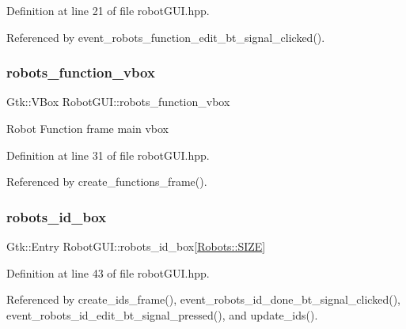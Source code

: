 Definition at line 21 of file robot\+G\+U\+I.\+hpp.



Referenced by event\+\_\+robots\+\_\+function\+\_\+edit\+\_\+bt\+\_\+signal\+\_\+clicked().

\mbox{\label{class_robot_g_u_i_a6d09ae30b925d6efd7c16e20b21c1781}} 
\subsubsection{\texorpdfstring{robots\+\_\+function\+\_\+vbox}{robots\_function\_vbox}}
{\footnotesize\ttfamily Gtk\+::\+V\+Box Robot\+G\+U\+I\+::robots\+\_\+function\+\_\+vbox\hspace{0.3cm}{\ttfamily [private]}}

Robot Function frame main vbox 

Definition at line 31 of file robot\+G\+U\+I.\+hpp.



Referenced by create\+\_\+functions\+\_\+frame().

\mbox{\label{class_robot_g_u_i_a1e475a8f99d5f0b3b29286731ddf0550}} 
\subsubsection{\texorpdfstring{robots\+\_\+id\+\_\+box}{robots\_id\_box}}
{\footnotesize\ttfamily Gtk\+::\+Entry Robot\+G\+U\+I\+::robots\+\_\+id\+\_\+box\mbox{[}\hyperlink{class_robots_ae9df2f1d345ad6740f0459956cdd4712}{Robots\+::\+S\+I\+ZE}\mbox{]}\hspace{0.3cm}{\ttfamily [private]}}



Definition at line 43 of file robot\+G\+U\+I.\+hpp.



Referenced by create\+\_\+ids\+\_\+frame(), event\+\_\+robots\+\_\+id\+\_\+done\+\_\+bt\+\_\+signal\+\_\+clicked(), event\+\_\+robots\+\_\+id\+\_\+edit\+\_\+bt\+\_\+signal\+\_\+pressed(), and update\+\_\+ids().


